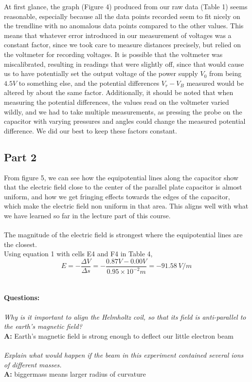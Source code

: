 \documentclass[letterpaper]{article}
\begin{document}
At first glance, the graph (Figure 4) produced from our raw data (Table 1) seems reasonable, especially
because all the data points recorded seem to fit nicely on the trendline with
no anomalous data points compared to the other values. This means that whatever error
introduced in our measurement of voltages was a constant factor, since we took care
to measure distances precisely, but relied on the voltmeter for recording voltages.
It is possible that the voltmeter was miscalibrated, resulting in readings that were slightly off,
since that would cause us to have potentially set the output voltage of the power supply $V_0$ from being $4.5 V$ to something else,
and the potential differences $V_r-V_B$ measured would be altered by about the same factor. Additionally,
it should be noted that when measuring the potential differences, the values read on the voltmeter varied
wildly, and we had to take multiple measurements, as pressing the probe on the capacitor with varying pressures and
angles could change the measured potential difference. We did our best to keep these factors constant.

\subsection{Part 2}
From figure 5, we can see how the equipotential lines along the capacitor show that the
electric field close to the center of the parallel plate capacitor is almost uniform, and
how we get fringing effects towards the edges of the capacitor, which make the electric field non uniform
in that area. This aligns well with what we have learned so far in the lecture part of this course.
\\ \\
The magnitude of the electric field is strongest where the equipotential lines are the closest.\\
Using equation 1 with cells E4 and F4 in Table 4,
$$ E=-\frac{\Delta V}{\Delta s}= -\frac{0.87 V -0.00 V}{0.95\times 10^{-2} m} = -91.58 \:V/m $$
\\ \\
\textbf{Questions: }\\ \\
\textit{Why is it important to align the Helmholtz coil, so that its field is
        anti-parallel to the earth's magnetic field?}\\
\textbf{A:}
Earth's magnetic field is strong enough to deflect our little electron beam\\ \\
\textit{Explain what would happen if the beam in this experiment contained several ions of different masses.}\\
\textbf{A:}
biggermass means larger radius of curvature
\end{document}
